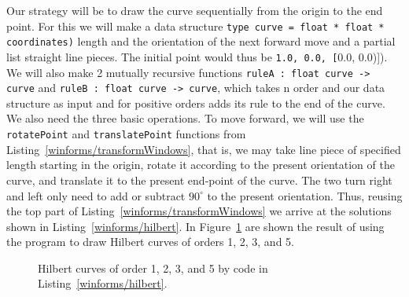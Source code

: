Our strategy will be to draw the curve sequentially from the origin to the end point. For this we will make a data structure \lstinline!type curve = float * float * coordinates)! length and the orientation of the next forward move and a partial list straight line pieces. The initial point would thus be \lstinline(1.0, 0.0, [(0.0, 0.0)]). We will also make 2 mutually recursive functions \lstinline!ruleA : float curve -> curve! and \lstinline!ruleB : float curve -> curve!, which takes n order and our data structure as input and for positive orders adds its rule to the end of the curve. We also need the three basic operations. To move forward, we will use the \lstinline!rotatePoint! and \lstinline!translatePoint! functions from Listing~\ref{winforms/transformWindows}, that is, we may take line piece of specified length starting in the origin, rotate it according to the present orientation of the curve, and translate it to the present end-point of the curve. The two turn right and left only need to add or subtract $90^{\circ}$ to the present orientation. Thus, reusing the top part of Listing~\ref{winforms/transformWindows} we arrive at the solutions shown in Listing~\ref{winforms/hilbert}. In Figure~\ref{fig:hilbert} are shown the result of using the program to draw Hilbert curves of orders 1, 2, 3, and 5.
%
%
\begin{figure}
  \centering
  \caption{Hilbert curves of order 1, 2, 3, and 5 by code in Listing~\ref{winforms/hilbert}.}
  \label{fig:hilbert}
\end{figure}

